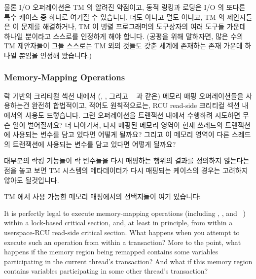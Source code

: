 물론 I/O 오퍼레이션은 TM 의 알려진 약점이고, 동적 링킹과 로딩은 I/O 의 또다른
특수 케이스 중 하나로 여겨질 수 있습니다.
더도 아니고 덜도 아니고, TM 의 제안자들은 이 문제를 해결하거나, TM 이 병렬
프로그래머의 도구상자의 여러 도구들 가운데 하나일 뿐이라고 스스로를 인정하게
해야 합니다.
(공평을 위해 말하자면, 많은 수의 TM 제안자들이 그들 스스로는 TM 외의 것들도
갖춘 세계에 존재하는 존재 가운데 하나일 뿐임을 인정해 왔습니다.)

\subsubsection{Memory-Mapping Operations}
\label{sec:future:Memory-Mapping Operations}

락 기반의 크리티컬 섹션 내에서 (, , 그리고
~\cite{TheOpenGroup1997SUS} 과 같은) 메모리 매핑 오퍼레이션들을
사용하는건 완전히 합법적이고, 적어도 원칙적으로는, RCU read-side 크리티컬 섹션
내에서의 사용도 드렇습니다.
그런 오퍼레이션을 트랜잭션 내에서 수행하려 시도하면 무슨 일이 벌어질까요?
더 나아가서, 다시 매핑된 메모리 영역이 현재 쓰레드의 트랜잭션에 사용되는 변수를
담고 있다면 어떻게 될까요?
그리고 이 메모리 영역이 다른 스레드의 트랜잭션에 사용되는 변수를 담고 있다면
어떻게 될까요?

대부분의 락킹 기능들이 락 변수들을 다시 매핑하는 행위의 결과를 정의하지
않는다는 점을 놓고 보면 TM 시스템의 메타데이터가 다시 매핑되는 케이스의 경우는
고려하지 않아도 될것입니다.

TM 에서 사용 가능한 메모리 매핑에서의 선택지들이 여기 있습니다:
\iffalse

It is perfectly legal to execute memory-mapping operations (including
, , and ~\cite{TheOpenGroup1997SUS})
within a lock-based critical section, and, at least in principle, from
within a userspace-RCU read-side critical section.
What happens when you attempt to execute such an operation from within
a transaction?
More to the point, what happens if the memory region being remapped
contains some variables participating in the current thread's transaction?
And what if this memory region contains variables participating in some
other thread's transaction?

